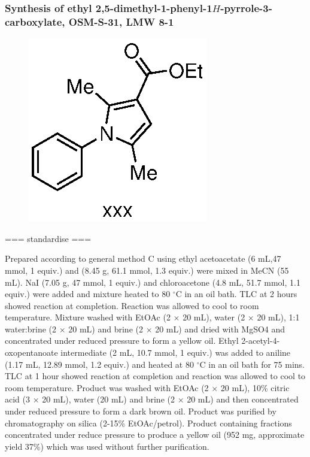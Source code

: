 \documentclass[12pt, a4paper,titlepage]{article}
\begin{document}
\subsubsection*{ Synthesis of ethyl 2,5-dimethyl-1-phenyl-1$H$-pyrrole-3-carboxylate, OSM-S-31, LMW 8-1}
	\label{exp:LMW8}
	\begin{figure}[H]
	\begin{center}
	\includegraphics{exp/LMW8.eps}
	\end{center}
	\vspace{-25pt}	
	\end{figure}	

=== standardise ===

Prepared according to general method C using ethyl acetoacetate (6 mL,47 mmol, 1 equiv.) and  (8.45 g, 61.1 mmol, 1.3 equiv.) were mixed in MeCN (55 mL). NaI (7.05 g, 47 mmol, 1 equiv.) and chloroacetone (4.8 mL, 51.7 mmol, 1.1 equiv.) were added and mixture heated to 80 $^\circ$C in an oil bath. TLC at 2 hours showed reaction at completion. Reaction was allowed to cool to room temperature. Mixture washed with EtOAc (2 $\times$ 20 mL), water (2 $\times$ 20 mL), 1:1 water:brine (2 $\times$ 20 mL) and brine (2 $\times$ 20 mL) and dried with MgSO4 and concentrated under reduced pressure to form a yellow oil. Ethyl 2-acetyl-4-oxopentanoate intermediate (2 mL, 10.7 mmol, 1 equiv.) was added to aniline (1.17 mL, 12.89 mmol, 1.2 equiv.) and heated at 80 $^\circ$C in an oil bath for 75 mins. TLC at 1 hour showed reaction at completion and reaction was allowed to cool to room temperature. Product was washed with EtOAc (2 $\times$ 20 mL), 10\% citric acid (3 $\times$ 20 mL), water (20 mL) and brine (2 $\times$ 20 mL) and then concentrated under reduced pressure to form a dark brown oil. Product was purified by chromatography on silica (2-15\% EtOAc/petrol). Product containing fractions concentrated under reduce pressure to produce a yellow oil (952 mg, approximate yield 37\%) which was used without further purification.
\end{document}
